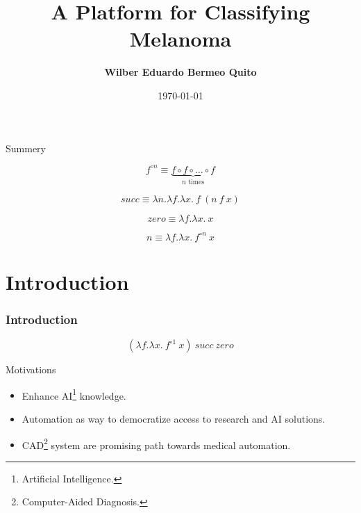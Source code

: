 \documentclass[dvipsnames,mathserif]{beamer}
\begin{document}
  \rightskip\rightmargin
  \title{A Platform for Classifying Melanoma}
  \author{ \Large \textbf{Wilber Eduardo Bermeo Quito} }
  \footnotesize{\date{\today }


    \begin{frame}
      \maketitle
    \end{frame}

    \begin{frame}{Summery}
      \footnotesize \tableofcontents

    \end{frame}

    \begin{frame}

      \[f^{\circ n} \equiv \underbrace{f \circ f \circ \ldots \circ f}_{n \text{ times}} \]

      \[succ \equiv \lambda n. \lambda f. \lambda x.\ f\ (n\ f\ x) \]

      \[zero \equiv \lambda f. \lambda x.\ x\]

      \[n \equiv \lambda f. \lambda x.\ f^{\circ n}\ x\]

    \end{frame}

    \section{Introduction}


    \begin{frame}
      \frametitle{Introduction}

      \[(\lambda f. \lambda x.\ f^{\circ 1}\ x)\ succ\ zero\]

    \end{frame}


    \begin{frame}
      \large Motivations
      \vspace{0.25cm}

      \footnotesize
      \begin{itemize}
        \item Enhance AI\footnote{Artificial Intelligence.} knowledge.
        \item Automation as way to democratize access to research and AI solutions.
        \item CAD\footnote{Computer-Aided Diagnosis.} system are promising path
          towards medical automation.
      \end{itemize}
    \end{frame}


}
\end{document}
